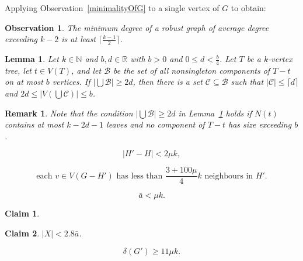 \documentclass[10pt,a4paper]{amsart}
\newtheorem{observation}{Observation}
\newtheorem{lemma}{Lemma}
\newtheorem{remark}{Remark}
\newtheorem{claim}{Claim}
\begin{document}
Applying Observation~\ref{minimalityOfG} to a single vertex of $G$ to obtain:
\begin{observation}\label{minDegofG}
The minimum degree of a robust graph
 of average degree exceeding $k-2$ is at least $\lceil \frac{k-1}{2}\rceil$.
 \end{observation}

\begin{lemma}
\label{subsetofcompsofT2}
 Let $k\in\mathbb N$ and $b,d\in\mathbb R$  with $b>0$ and $0\le d< \frac b4$. Let $T$ be a $k$-vertex tree, let $t\in V(T)$, and let  
$\mathcal B$ be the set of all nonsingleton components of $T-t$ on at most  $b$ vertices. If $|\bigcup\mathcal B|\ge 2d$, 
 then there is a set  $\mathcal C\subseteq \mathcal B$   such that $|\mathcal C|\le \lceil d\rceil$ and $2d \le |V(\bigcup \mathcal C)|\le b$.
\end{lemma}

\begin{remark}\label{theremark}
    Note that the condition $|\bigcup\mathcal B|\ge 2d$ in Lemma~\ref{subsetofcompsofT2} holds if $N(t)$ contains at most $k-2d-1$ leaves and no component of $T-t$ has size exceeding $b$. 
\end{remark}

   \begin{equation}\label{not2muk}
   |H'-H|<2\mu k,
   \end{equation}

\begin{equation}\label{outsideH'baddeg}
   \text{each $v\in V(G-H')$ has less than $\frac{3+100\mu}{4}k$ neighbours in $H'$.}
   \end{equation}

    \begin{equation}\label{bara}
  \bar a <\mu k.
   \end{equation}

 \begin{claim}\label{thasatmostmukleafch}
          \end{claim} 

\begin{claim}
\label{claimwas(60)}
  $|X| < 2.8\bar a$.
\end{claim}

\begin{equation}
    \label{mindegggforreal}
    \delta(G')\ge 11 \mu k.
\end{equation}
\end{document}
